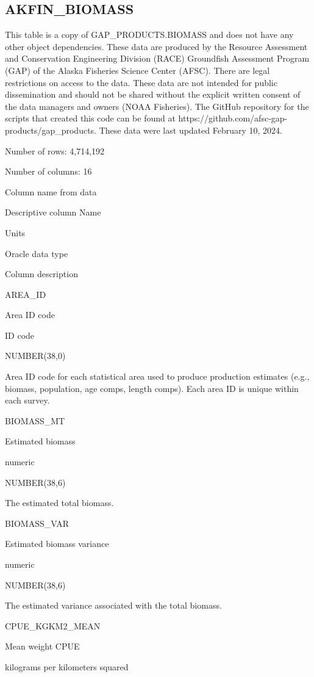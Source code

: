 \documentclass[
  letterpaper,
  oneside,
  open=any]{scrbook}
\begin{document}
\hypertarget{akfin_biomass}{%
\subsection{AKFIN\_BIOMASS}\label{akfin_biomass}}

This table is a copy of GAP\_PRODUCTS.BIOMASS and does not have any
other object dependencies. These data are produced by the Resource
Assessment and Conservation Engineering Division (RACE) Groundfish
Assessment Program (GAP) of the Alaska Fisheries Science Center (AFSC).
There are legal restrictions on access to the data. These data are not
intended for public dissemination and should not be shared without the
explicit written consent of the data managers and owners (NOAA
Fisheries). The GitHub repository for the scripts that created this code
can be found at https://github.com/afsc-gap-products/gap\_products.
These data were last updated February 10, 2024.

Number of rows: 4,714,192

Number of columns: 16

Column name from data

Descriptive column Name

Units

Oracle data type

Column description

AREA\_ID

Area ID code

ID code

NUMBER(38,0)

Area ID code for each statistical area used to produce production
estimates (e.g., biomass, population, age comps, length comps). Each
area ID is unique within each survey.

BIOMASS\_MT

Estimated biomass

numeric

NUMBER(38,6)

The estimated total biomass.

BIOMASS\_VAR

Estimated biomass variance

numeric

NUMBER(38,6)

The estimated variance associated with the total biomass.

CPUE\_KGKM2\_MEAN

Mean weight CPUE

kilograms per kilometers squared
\end{document}
